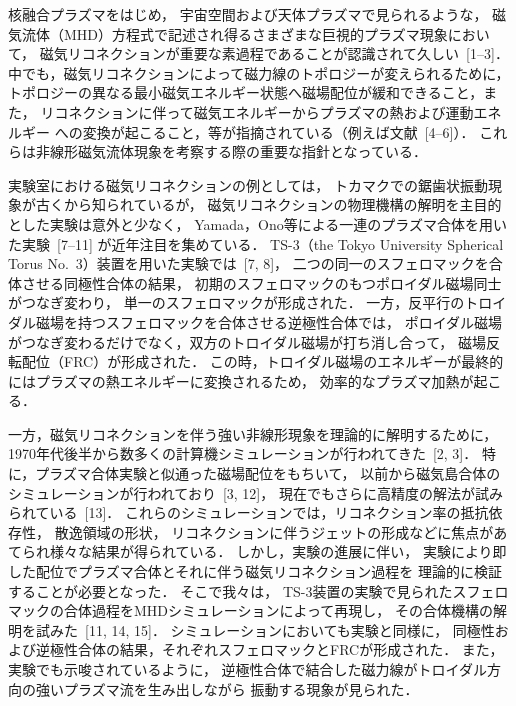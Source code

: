 \documentclass{jspf}            %
\begin{document}

核融合プラズマをはじめ，
宇宙空間および天体プラズマで見られるような，
磁気流体（MHD）方程式で記述され得るさまざまな巨視的プラズマ現象において，
磁気リコネクションが重要な素過程であることが認識されて久しい~[1--3]．
中でも，磁気リコネクションによって磁力線のトポロジーが変えられるために，
トポロジーの異なる最小磁気エネルギー状態へ磁場配位が緩和できること，また，
リコネクションに伴って磁気エネルギーからプラズマの熱および運動エネルギー
への変換が起こること，等が指摘されている（例えば文献~[4--6]）．
これらは非線形磁気流体現象を考察する際の重要な指針となっている．

実験室における磁気リコネクションの例としては，
トカマクでの鋸歯状振動現象が古くから知られているが，
磁気リコネクションの物理機構の解明を主目的とした実験は意外と少なく，
Yamada，Ono等による一連のプラズマ合体を用いた実験~[7--11] が近年注目を集めている．
TS-3（the Tokyo University Spherical Torus No.~3）装置を用いた実験では~[7, 8]，
二つの同一のスフェロマックを合体させる同極性合体の結果，
初期のスフェロマックのもつポロイダル磁場同士がつなぎ変わり，
単一のスフェロマックが形成された．
一方，反平行のトロイダル磁場を持つスフェロマックを合体させる逆極性合体では，
ポロイダル磁場がつなぎ変わるだけでなく，双方のトロイダル磁場が打ち消し合って，
磁場反転配位（FRC）が形成された．
この時，トロイダル磁場のエネルギーが最終的にはプラズマの熱エネルギーに変換されるため，
効率的なプラズマ加熱が起こる．

一方，磁気リコネクションを伴う強い非線形現象を理論的に解明するために，
1970年代後半から数多くの計算機シミュレーションが行われてきた~[2, 3]．
特に，プラズマ合体実験と似通った磁場配位をもちいて，
以前から磁気島合体のシミュレーションが行われており~[3, 12]，
現在でもさらに高精度の解法が試みられている~[13]．
これらのシミュレーションでは，リコネクション率の抵抗依存性，
散逸領域の形状，
リコネクションに伴うジェットの形成などに焦点があてられ様々な結果が得られている．
しかし，実験の進展に伴い，
実験により即した配位でプラズマ合体とそれに伴う磁気リコネクション過程を
理論的に検証することが必要となった．
そこで我々は，
TS-3装置の実験で見られたスフェロマックの合体過程をMHDシミュレーションによって再現し，
その合体機構の解明を試みた~[11, 14, 15]．
シミュレーションにおいても実験と同様に，
同極性および逆極性合体の結果，それぞれスフェロマックとFRCが形成された．
また，実験でも示唆されているように，
逆極性合体で結合した磁力線がトロイダル方向の強いプラズマ流を生み出しながら
振動する現象が見られた．
\end{document}

